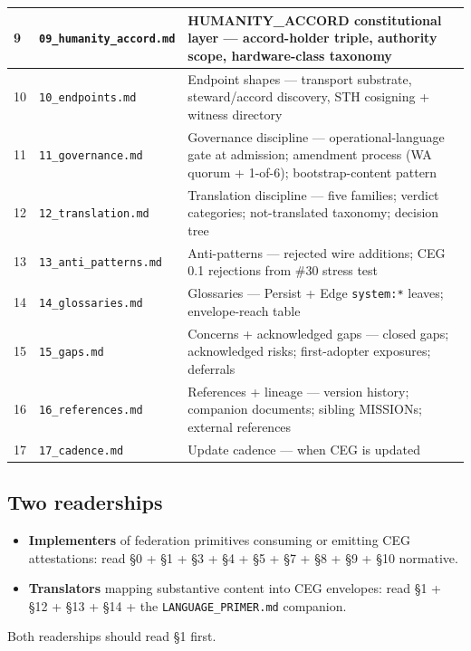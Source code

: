 \documentclass[11pt]{article}
\begin{document}
{\begin{longtable}{|p{5.33cm}|p{5.33cm}|p{5.33cm}|}
9 & \texttt{09\_humanity\_accord.md} & HUMANITY\_ACCORD constitutional layer — accord-holder triple, authority scope, hardware-class taxonomy \\ \hline
10 & \texttt{10\_endpoints.md} & Endpoint shapes — transport substrate, steward/accord discovery, STH cosigning + witness directory \\ \hline
11 & \texttt{11\_governance.md} & Governance discipline — operational-language gate at admission; amendment process (WA quorum + 1-of-6); bootstrap-content pattern \\ \hline
12 & \texttt{12\_translation.md} & Translation discipline — five families; verdict categories; not-translated taxonomy; decision tree \\ \hline
13 & \texttt{13\_anti\_patterns.md} & Anti-patterns — rejected wire additions; CEG 0.1 rejections from \#30 stress test \\ \hline
14 & \texttt{14\_glossaries.md} & Glossaries — Persist + Edge \texttt{system:*} leaves; envelope-reach table \\ \hline
15 & \texttt{15\_gaps.md} & Concerns + acknowledged gaps — closed gaps; acknowledged risks; first-adopter exposures; deferrals \\ \hline
16 & \texttt{16\_references.md} & References + lineage — version history; companion documents; sibling MISSIONs; external references \\ \hline
17 & \texttt{17\_cadence.md} & Update cadence — when CEG is updated \\ \hline
\end{longtable}}



\subsection*{Two readerships}


\begin{itemize}\setlength\itemsep{0pt}
\item \textbf{Implementers} of federation primitives consuming or emitting CEG attestations: read §0 + §1 + §3 + §4 + §5 + §7 + §8 + §9 + §10 normative.
\item \textbf{Translators} mapping substantive content into CEG envelopes: read §1 + §12 + §13 + §14 + the \texttt{LANGUAGE\_PRIMER.md} companion.
\end{itemize}


Both readerships should read §1 first.


\clearpage
\end{document}
